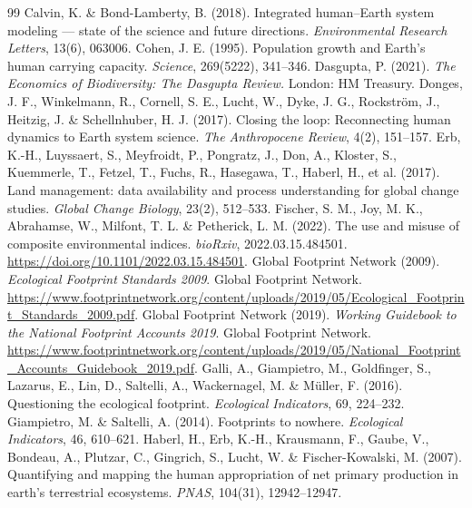 \documentclass[preprint,12pt,authoryear]{elsarticle}
\begin{document}
\begin{thebibliography}{99}
 Calvin, K. \& Bond-Lamberty, B. (2018). Integrated human--Earth system modeling --- state of the science and future directions. \emph{Environmental Research Letters}, 13(6), 063006.
 Cohen, J. E. (1995). Population growth and Earth's human carrying capacity. \emph{Science}, 269(5222), 341--346.
 Dasgupta, P. (2021). \emph{The Economics of Biodiversity: The Dasgupta Review.} London: HM Treasury.
 Donges, J. F., Winkelmann, R., Cornell, S. E., Lucht, W., Dyke, J. G., Rockstr\"om, J., Heitzig, J. \& Schellnhuber, H. J. (2017). Closing the loop: Reconnecting human dynamics to Earth system science. \emph{The Anthropocene Review}, 4(2), 151--157.
 Erb, K.-H., Luyssaert, S., Meyfroidt, P., Pongratz, J., Don, A., Kloster, S., Kuemmerle, T., Fetzel, T., Fuchs, R., Hasegawa, T., Haberl, H., et al. (2017). Land management: data availability and process understanding for global change studies. \emph{Global Change Biology}, 23(2), 512--533.
 Fischer, S. M., Joy, M. K., Abrahamse, W., Milfont, T. L. \& Petherick, L. M. (2022). The use and misuse of composite environmental indices. \emph{bioRxiv}, 2022.03.15.484501. \url{https://doi.org/10.1101/2022.03.15.484501}.
 Global Footprint Network (2009). \emph{Ecological Footprint Standards 2009}. Global Footprint Network. \url{https://www.footprintnetwork.org/content/uploads/2019/05/Ecological_Footprint_Standards_2009.pdf}.
 Global Footprint Network (2019). \emph{Working Guidebook to the National Footprint Accounts 2019}. Global Footprint Network. \url{https://www.footprintnetwork.org/content/uploads/2019/05/National_Footprint_Accounts_Guidebook_2019.pdf}.
 Galli, A., Giampietro, M., Goldfinger, S., Lazarus, E., Lin, D., Saltelli, A., Wackernagel, M. \& M\"uller, F. (2016). Questioning the ecological footprint. \emph{Ecological Indicators}, 69, 224--232.
 Giampietro, M. \& Saltelli, A. (2014). Footprints to nowhere. \emph{Ecological Indicators}, 46, 610--621.
 Haberl, H., Erb, K.-H., Krausmann, F., Gaube, V., Bondeau, A., Plutzar, C., Gingrich, S., Lucht, W. \& Fischer-Kowalski, M. (2007). Quantifying and mapping the human appropriation of net primary production in earth's terrestrial ecosystems. \emph{PNAS}, 104(31), 12942--12947.

\end{thebibliography}
\end{document}
